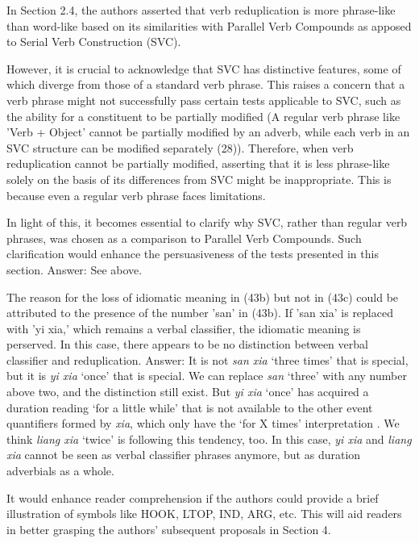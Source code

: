 \documentclass[fleqn,twoside]{article}
\begin{document}
{In Section 2.4, the authors asserted that verb reduplication is more phrase-like than word-like based on its similarities with Parallel Verb Compounds as apposed to Serial Verb Construction (SVC). 

However, it is crucial to acknowledge that SVC has distinctive features, some of which diverge from those of a standard verb phrase. This raises a concern that a verb phrase might not successfully pass certain tests applicable to SVC, such as the ability for a constituent to be partially modified (A regular verb phrase like 'Verb + Object' cannot be partially modified by an adverb, while each verb in an SVC structure can be modified separately (28)). Therefore, when verb reduplication cannot be partially modified, asserting that it is less phrase-like solely on the basis of its differences from SVC might be inappropriate. This is because even a regular verb phrase faces limitations. 

In light of this, it becomes essential to clarify why SVC, rather than regular verb phrases, was
chosen as a comparison to Parallel Verb Compounds. Such clarification would enhance the
persuasiveness of the tests presented in this section. 
Answer: See above.


The reason for the loss of idiomatic meaning in (43b) but not in (43c) could be attributed to the
presence of the number 'san' in (43b). If 'san xia' is replaced with 'yi xia,' which remains a
verbal classifier, the idiomatic meaning is perserved. In this case, there appears to be no
distinction between verbal classifier and reduplication. 
Answer:
It is not \textit{san xia} `three times' that is special, but it is \textit{yi xia} `once' that is special.
We can replace \textit{san} `three' with any number above two,
and the distinction still exist.
But \textit{yi xia} `once' has acquired a duration reading `for a little while' that is not available to the other event quantifiers formed by \textit{xia}, which only have the `for X times' interpretation \citep[77]{Deng2013}.
We think \textit{liang xia} `twice' is following this tendency, too.
In this case, \textit{yi xia} and \textit{liang xia} cannot be seen as verbal classifier phrases anymore, but as duration adverbials as a whole.

It would enhance reader comprehension if the authors could provide a brief illustration of symbols
like HOOK, LTOP, IND, ARG, etc. This will aid readers in better grasping the authors' subsequent
proposals in Section 4. 


}
\end{document}
